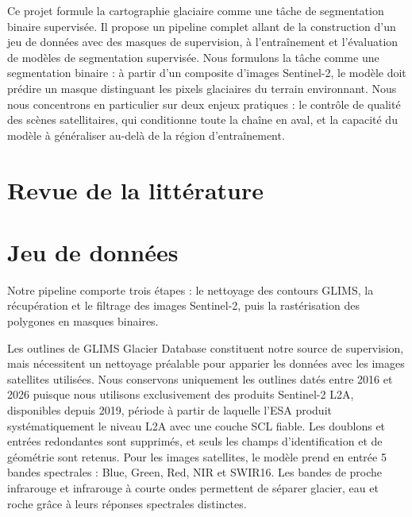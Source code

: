 \documentclass[11pt]{article}
\begin{document}
Ce projet formule la cartographie glaciaire comme une tâche de segmentation binaire supervisée. Il propose un pipeline complet allant de la construction d'un jeu de données avec des masques de supervision, à l'entraînement et l'évaluation de modèles de segmentation supervisée. Nous formulons la tâche comme une segmentation binaire : à partir d'un composite d'images Sentinel-2, le modèle doit prédire un masque distinguant les pixels glaciaires du terrain environnant. Nous nous concentrons en particulier sur deux enjeux pratiques : le contrôle de qualité des scènes satellitaires, qui conditionne toute la chaîne en aval, et la capacité du modèle à généraliser au-delà de la région d'entraînement.
 
 
\pagebreak
\section{Revue de la littérature}

 
 
\pagebreak
\section{Jeu de données}
 
Notre pipeline comporte trois étapes : le nettoyage des contours GLIMS, la récupération et le filtrage des images Sentinel-2, puis la rastérisation des polygones en masques binaires.
 
Les outlines de GLIMS Glacier Database constituent notre source de supervision, mais nécessitent un nettoyage préalable pour apparier les données avec les images satellites utilisées. Nous conservons uniquement les outlines datés entre 2016 et 2026 puisque nous utilisons exclusivement des produits Sentinel-2 L2A, disponibles depuis 2019, période à partir de laquelle
l'ESA produit systématiquement le niveau L2A avec une couche SCL
fiable. Les doublons et entrées redondantes sont supprimés, et seuls les champs d'identification et de géométrie sont retenus. Pour les images satellites, le modèle prend en entrée 5 bandes spectrales : Blue, Green, Red, NIR et SWIR16. Les bandes de proche infrarouge et infrarouge à courte ondes permettent de séparer glacier, eau et roche grâce à leurs réponses spectrales distinctes. 
 
\end{document}
